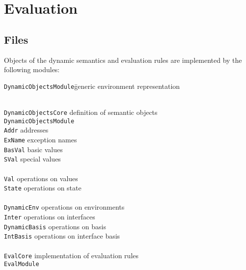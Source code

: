 \documentclass[twoside,titlepage]{article}
\begin{document}
\section{Evaluation}
\label{evaluation}

\subsection{Files}
\label{evaluationfiles}

Objects of the dynamic semantics and evaluation rules are implemented by the following modules:

\begin{quoting}
\begin{tabbing}
{\tt DynamicObjectsModule}\qquad\= generic environment representation
\kill

\hspace{-1em}{\tt eval/} \\
{\tt DynamicObjectsCore} \> definition of semantic objects \\
{\tt DynamicObjectsModule} \> \\

{\tt Addr}		\> addresses \\
{\tt ExName}		\> exception names \\
{\tt BasVal}		\> basic values \\
{\tt SVal}		\> special values \\
\\
{\tt Val}		\> operations on values \\
{\tt State}		\> operations on state \\
\\
{\tt DynamicEnv}	\> operations on environments \\
{\tt Inter}		\> operations on interfaces \\
{\tt DynamicBasis}	\> operations on basis \\
{\tt IntBasis}		\> operations on interface basis \\
\\
{\tt EvalCore}		\> implementation of evaluation rules \\
{\tt EvalModule}	\> \\
\end{tabbing}
\end{quoting}
\end{document}
